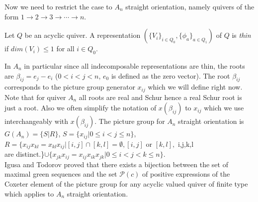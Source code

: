 \indent Now we need to restrict the case to $A_n$ straight orientation, namely quivers of the form $1\to 2\to 3\to\cdots\to n$.
\begin{definition}
Let $Q$ be an acyclic quiver. A representation $(\{V_i\}_{i\in Q_0}, \{\phi_a\}_{a\in Q_1})$ of $Q$ is \textit{thin} if $dim(V_i) \leq 1$ for all $i\in Q_0$.
\end{definition}
\indent In $A_n$ in particular since all indecomposable representations are thin, the roots are $\beta_{ij}=e_j-e_i$ ($0<i<j<n$, $e_0$ is defined as the zero vector). The root $\beta_{ij}$ corresponds to the picture group generator $x_{ij}$ which we will define right now.\\
\indent Note that for quiver $A_n$ all roots are real and Schur hence a real Schur root is just a root. Also we often simplify the notation of $x(\beta_{ij})$ to $x_{ij}$ which we use interchangeably with $x(\beta_{ij})$. The picture group for $A_n$ straight orientation is $G(A_n)=\{S|R\}$, $S=\{x_{ij}|0\leq i<j\leq n\}$, $R=\{x_{ij}x_{kl}=x_{kl}x_{ij}|[i,j]\cap[k,l]=\emptyset, [i,j]\text{ or }[k,l], $ i,j,k,l \\are distinct.\}$\cup\{x_{jk}x_{ij}=x_{ij}x_{ik}x_{jk}|0\leq i<j<k\leq n\}$.\\
\indent Igusa and Todorov proved \cite{IT17} that there exists a bijection between the set of maximal green sequences and the set $\mathcal{P}(c)$ of positive expressions of the Coxeter element of the picture group for any acyclic valued quiver of finite type which applies to $A_n$ straight orientation.\\
